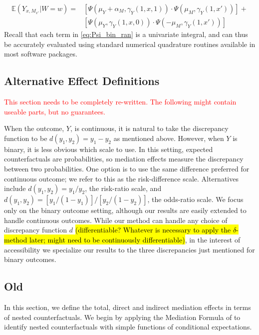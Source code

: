 \documentclass{article}
\newcommand{\bE}{\mathbb{E}}
\begin{document}
%
\begin{align}
    \bE (Y_{x, M_{x'}} | W=w) = & \left[  \Psi(\mu_Y + \alpha_M, \gamma_Y(1, x, 1)) \cdot \Psi(\mu_M , \gamma_Y(1, x')) \right] + \label{eq:Psi_bin_ran}\\
    & \left[ \Psi(\mu_Y, \gamma_Y(1, x, 0)) \cdot \Psi(- \mu_M , \gamma_Y(1, x')) \right] \nonumber
\end{align}
%
Recall that each term in \eqref{eq:Psi_bin_ran} is a univariate integral, and can thus be accurately evaluated using standard numerical quadrature routines available in most software packages.






\subsection{Alternative Effect Definitions}

\textcolor{red}{This section needs to be completely re-written. The following might contain useable parts, but no guarantees.}

When the outcome, $Y$, is continuous, it is natural to take the discrepancy function to be $d(y_1, y_2) = y_1 - y_2$ as mentioned above. However, when $Y$ is binary, it is less obvious which scale to use. In this setting, expected counterfactuals are probabilities, so mediation effects measure the discrepancy between two probabilities. One option is to use the same difference preferred for continuous outcome; we refer to this as the risk-difference scale. Alternatives include $d(y_1, y_2) = y_1 / y_2$, the risk-ratio scale, and $d(y_1, y_2) = [y_1 / (1 - y_1)] / [y_2 / (1 - y_2)]$, the odds-ratio scale. We focus only on the binary outcome setting, although our results are easily extended to handle continuous outcomes. While our method can handle any choice of discrepancy function $d$ \hl{(differentiable? Whatever is necessary to apply the $\delta$-method later; might need to be continuously differentiable)}, in the interest of accessibility we specialize our results to the three discrepancies just mentioned for binary outcomes.


\subsection{Old}


In this section, we define the total, direct and indirect mediation effects in terms of nested counterfactuals. We begin by applying the Mediation Formula of \citet{Pea12} to identify nested counterfactuals with simple functions of conditional expectations.
\end{document}
